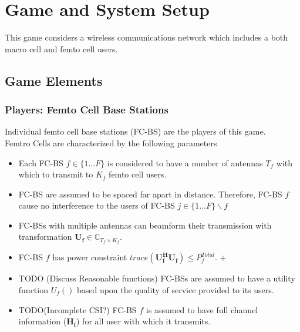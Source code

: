 \documentclass[12pt]{article}
\begin{document}
\section{Game and System Setup}

This game considers a wireless communications network which includes a both macro cell and femto cell users.

\subsection{Game Elements}
\subsubsection{Players: Femto Cell Base Stations}


Individual femto cell base stations (FC-BS) are the players of this game.
\\
Femtro Cells are characterized by the following parameters
\begin{itemize}
\item Each FC-BS  $f \in \{1 ... F\}$ is considered to have a number of antennas $T_f$ with which to transmit to $K_f$ femto cell users.
\\
\item FC-BS are assumed to be spaced far apart in distance. Therefore, FC-BS $f$ cause no interference to the users of FC-BS $j \in \{1 ... F\}\backslash f$
\\
\item FC-BSs with multiple antennas can beamform their transmission with transformation $\mathbf{U_f} \in \mathbb{C}_{T_f \times K_f}$.
\\
\item 
FC-BS $f$ has power constraint  $trace(\mathbf{U_f^H}\mathbf{U_f}) \leq P^{Total}_{f} $. +

\item 
TODO (Discuss Reasonable functions) FC-BSs are assumed to have a utility function $U_f()$ based upon the quality of service provided to its users.
\\
\item TODO(Incomplete CSI?) FC-BS $f$ is assumed to have full channel information ($\mathbf{H_f}$) for all user  with which it transmits.
\\
\end{itemize}
\end{document}
